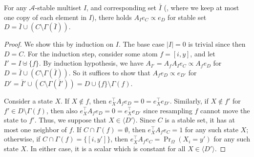 \documentclass{toc}
\begin{document}
\begin{proposition}
\label{add-1-prop_00}
For any $\mathcal A$-stable multiset $I$, and corresponding set $\bar I$ (\ie, where we keep at most one copy of each element in $I$), there holds $A_I e_C \propto e_{D}$ for stable set $D = \bar I \cup (C \setminus \Gamma(\bar I))$.
\end{proposition}
\begin{proof}
We show this by induction on $I$. The base case $|I| = 0$ is trivial since then $D = C$. For the induction step, consider some atom $f = [i,y]$, and let $I' = I \uplus \{ f \}$. By induction hypothesis, we have $A_{I'} = A_f A_I e_C \propto A_f e_D$ for $D = \bar I \cup (C \setminus \Gamma(\bar I))$. So it suffices to show that $A_f e_D \propto e_{D'}$ for $D' = \bar I' \cup (C \setminus \Gamma(\bar I')) = D \cup \{f \} \setminus \Gamma(f)$.

Consider a state $X$. If $X \notin f$, then $e_{X}^{\top} A_f e_D = 0 = e_{X}^{\top} e_{D'}$. Similarly, if $X\notin f'$ for $f' \in D \setminus \Gamma(f)$, then also $e_{X}^{\top} A_f e_D = 0 = e_{X}^{\top} e_{D'}$ since resampling $f$ cannot move the state to $f'$.  Thus, we suppose that $X \in \langle D' \rangle$.  Since $C$ is a stable set, it has at most one neighbor of $f$. If $C \cap \Gamma(f)  = \emptyset$, then $e_X^{\top} A_f e_C = 1$ for any such state $X$; otherwise, if $C \cap \Gamma(f) = \{ [i, y'] \}$, then $e_X^{\top} A_f e_C = \Pr_{\Omega}(X_i = y')$ for any such state $X$. In either case, it is a scalar which is constant for all $X \in \langle D' \rangle$.
\end{proof}
\end{document}
